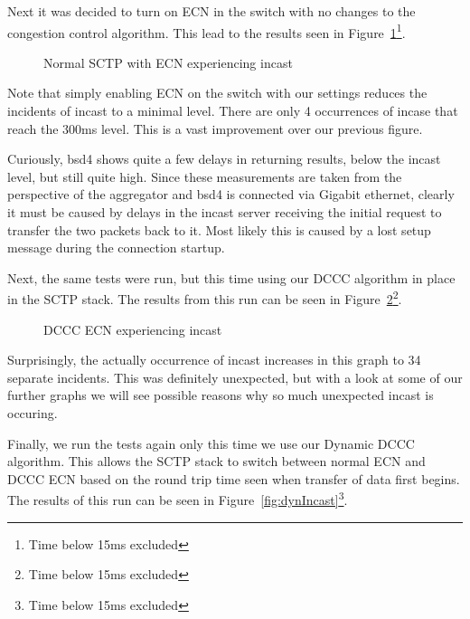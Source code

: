 \documentclass[12pt]{article}
\begin{document}
\newpage

Next it was decided to turn on ECN in the switch with no changes to the congestion control algorithm. This
lead to the results seen in Figure~\ref{fig:ecnIncast}\footnote{Time below 15ms excluded}.

\begin{figure}[h]
\centering
{}
\caption{Normal SCTP with ECN experiencing incast}
\label{fig:ecnIncast}
\end{figure}


Note that simply enabling ECN on the switch with our settings reduces the incidents of incast to a minimal
level. There are only 4 occurrences of incase that reach the 300ms level. This is a vast improvement over
our previous figure.  

Curiously,  bsd4 shows quite a few delays in returning results, below the incast level, 
but still quite high. Since these measurements are taken from the perspective of the aggregator and
bsd4 is connected via Gigabit ethernet, clearly it must be caused by delays in the incast server
receiving the initial request to transfer the two packets back to it. Most likely this is caused by
a lost setup message during the connection startup.

\newpage

Next, the same tests were run, but this time using our DCCC algorithm in place in the SCTP stack. The
results from this run can be seen in Figure~\ref{fig:dcccIncast}\footnote{Time below 15ms excluded}.

\begin{figure}[h]
\centering
{}
\caption{DCCC ECN experiencing incast}
\label{fig:dcccIncast}
\end{figure}


Surprisingly, the actually occurrence of incast increases in this graph to 34 separate incidents. This
was definitely unexpected, but with a look at some of our further graphs we will see possible
reasons why so much unexpected incast is occuring.

\newpage

Finally, we run the tests again only this time we use our Dynamic DCCC algorithm. This allows the
SCTP stack to switch between normal ECN and DCCC ECN based on the round trip time
seen when transfer of data first begins. The results of this run can be seen in Figure~\ref{fig:dynIncast}\footnote{Time below 15ms excluded}.
\end{document}
